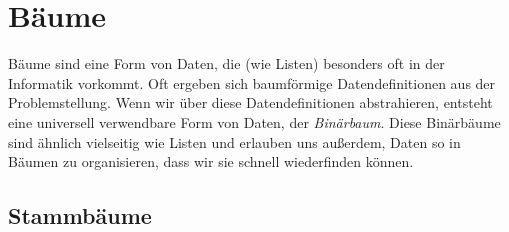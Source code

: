
\chapter{Bäume}
\label{cha:trees}

Bäume sind eine Form von Daten, die (wie Listen) besonders
oft in der Informatik vorkommt.  Oft ergeben sich baumförmige
Datendefinitionen aus der Problemstellung.  Wenn wir über diese
Datendefinitionen abstrahieren, entsteht eine universell verwendbare
Form von Daten, der \textit{Binärbaum}.  Diese
Binärbäume sind ähnlich vielseitig wie Listen und erlauben uns
außerdem, Daten so in Bäumen zu organisieren, dass wir sie schnell
wiederfinden können.

\section{Stammbäume}

